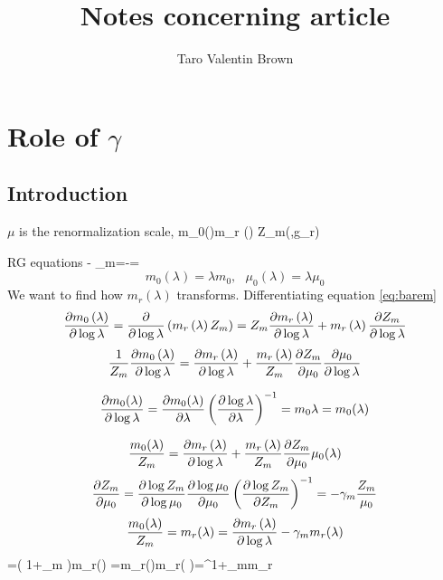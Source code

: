 \documentclass[a4,10pt,titlepage]{article}
\begin{document}
	\title{\textbf{Notes concerning article}}
	\author{Taro Valentin Brown}
	\maketitle
	\section{Role of $\gamma$}
	\subsection{Introduction}
$\mu$ is the renormalization scale,
\be \label{eq:barem}
m_0\lp(\lambda \rp)\equiv m_r \lp(\lambda \rp) Z_m(\epsilon,g_r)
\ee

RG equations
\be \label{eq:gammam}
- \gamma_m\equiv {}=-=
\ee
\[
m_0(\lambda)=\lambda m_0,\:\:\:\mu_0(\lambda)=\lambda \mu_0
\]
We want to find how $m_r(\lambda)$ transforms. Differentiating equation \ref{eq:barem}
\[
\pdv{m_0\left(\lambda \right)}{\log \lambda}=\pdv{}{\log \lambda}\left(m_r\left(\lambda \right) Z_m\right)=Z_m\pdv{m_r \left(\lambda \right)}{\log \lambda}+m_r\left(\lambda \right)\pdv{Z_m}{\log \lambda}
\]
\[
\frac{1}{Z_m}\pdv{m_0\left(\lambda \right)}{\log \lambda}=\pdv{m_r\left(\lambda \right)}{\log \lambda}+\frac{m_r\left(\lambda \right)}{Z_m}\pdv{Z_m}{\mu_0}\pdv{\mu_0}{\log \lambda}
\]

\[
\pdv{m_0(\lambda)}{\log\lambda}=\pdv{m_0(\lambda)}{\lambda}\left(\pdv{\log \lambda}{\lambda} \right)^{-1}=m_0\lambda=m_0(\lambda)
\]

\[
\frac{m_0(\lambda)}{Z_m}=\pdv{m_r\left(\lambda \right)}{\log \lambda}+\frac{m_r\left(\lambda \right)}{Z_m}\pdv{Z_m}{\mu_0}\mu_0(\lambda)
\]
\[
\pdv{Z_m}{\mu_0}=\pdv{\log Z_m}{\log \mu_0}\pdv{\log \mu_0}{\mu_0}\left(\pdv{\log Z_m}{Z_m}\right)^{-1}=-\gamma_m \frac{Z_m}{\mu_0}
\]
\[
\frac{m_0(\lambda)}{Z_m}=m_r(\lambda)=\pdv{m_r\left(\lambda \right)}{\log \lambda}-\gamma_m m_r(\lambda)
\]
\be
{}=\lp( 1+\gamma_m \rp)m_r(\lambda)
\ee
\be
{}=m_r(\lambda)\Rightarrow m_r( \lambda)=\lambda^{1+\gamma_m}m_r
\ee
\end{document}
